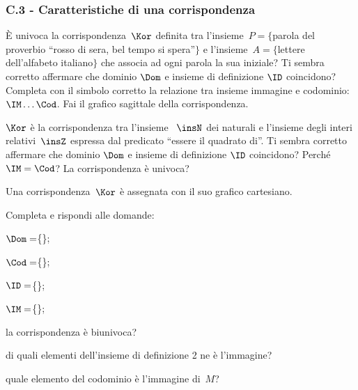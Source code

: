 \subsubsection*{C.3 - Caratteristiche di una corrispondenza}
\begin{esercizio}
\label{ese:C.4}
\`E univoca la corrispondenza~$\Kor$ definita tra l'insieme~$P= \{$parola del proverbio ``rosso di sera, bel tempo si spera''$\}$ e l'insieme~$A=\{$lettere dell'alfabeto italiano$\}$
che associa ad ogni parola la sua iniziale? Ti sembra corretto affermare che dominio $\Dom$ e insieme di definizione $\ID$ coincidono? Completa con il simbolo corretto
la relazione tra insieme immagine e codominio:~$\IM\ldots\Cod$. Fai il grafico sagittale della corrispondenza.
\end{esercizio}

\begin{esercizio}
\label{ese:C.5}
$\Kor$ è la corrispondenza tra l'insieme ~$\insN$ dei naturali e l'insieme degli interi relativi~$\insZ$ espressa dal predicato ``essere il quadrato di''. Ti sembra corretto affermare che
dominio $\Dom$ e insieme di definizione $\ID$ coincidono? Perché~$\IM=\Cod$? La corrispondenza è univoca?
\end{esercizio}

\pagebreak

\begin{esercizio}
\label{ese:C.6}
Una corrispondenza~$\Kor$ è assegnata con il suo grafico cartesiano.
\begin{center}
 
\end{center}
Completa e rispondi alle domande:

\begin{enumeratea}
\item $\Dom=$\{\dotfill\};
\item $\Cod=$\{\dotfill\};
\item $\ID=$\{\dotfill\};
\item $\IM=$\{\dotfill\};
\item la corrispondenza è biunivoca?
\item di quali elementi dell'insieme di definizione 2 ne è l'immagine?
\item quale elemento del codominio è l'immagine di~$M$?
\end{enumeratea}
\end{esercizio}

